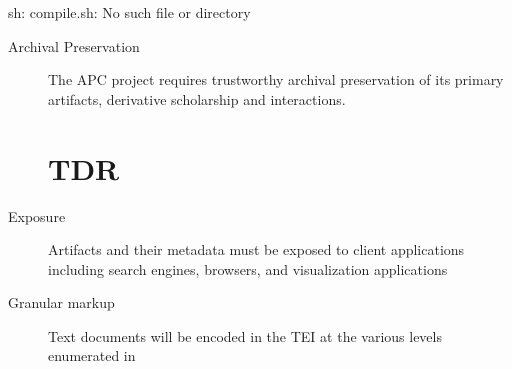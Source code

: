 sh: compile.sh: No such file or directory
\begin{description}
  \item[Archival Preservation]{The APC project requires trustworthy archival preservation of its primary artifacts, derivative scholarship and interactions.
    \section{TDR}
    
  }
  \item[Exposure] Artifacts and their metadata must be exposed to client applications including search engines, browsers, and visualization applications
  \item[Granular markup] Text documents will be encoded in the TEI at the various levels enumerated in \cite{tei_sig_on_libraries_best_2011} 
\end{description}
